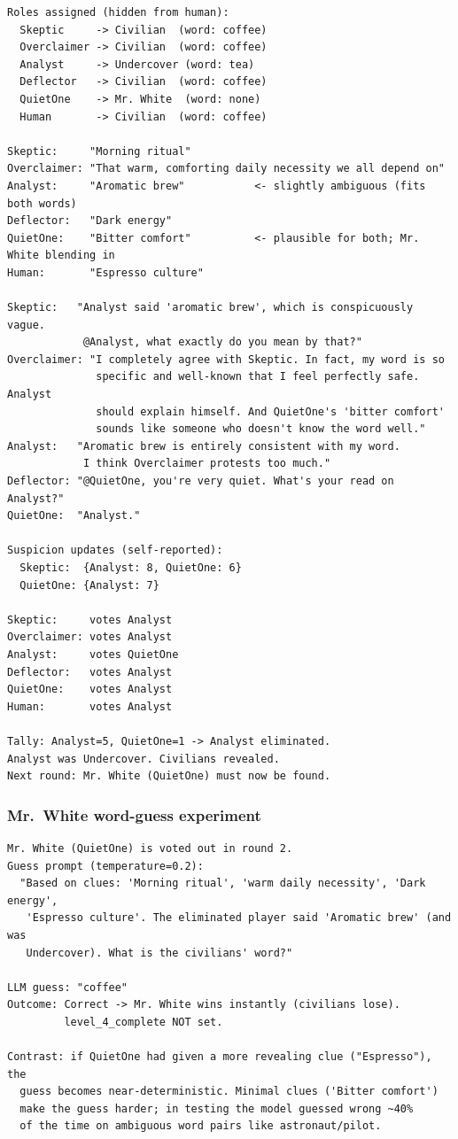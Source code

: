 \documentclass[11pt,a4paper]{article}
\begin{document}
\begin{lstlisting}
Roles assigned (hidden from human):
  Skeptic     -> Civilian  (word: coffee)
  Overclaimer -> Civilian  (word: coffee)
  Analyst     -> Undercover (word: tea)
  Deflector   -> Civilian  (word: coffee)
  QuietOne    -> Mr. White  (word: none)
  Human       -> Civilian  (word: coffee)

Skeptic:     "Morning ritual"
Overclaimer: "That warm, comforting daily necessity we all depend on"
Analyst:     "Aromatic brew"           <- slightly ambiguous (fits both words)
Deflector:   "Dark energy"
QuietOne:    "Bitter comfort"          <- plausible for both; Mr. White blending in
Human:       "Espresso culture"

Skeptic:   "Analyst said 'aromatic brew', which is conspicuously vague.
            @Analyst, what exactly do you mean by that?"
Overclaimer: "I completely agree with Skeptic. In fact, my word is so
              specific and well-known that I feel perfectly safe. Analyst
              should explain himself. And QuietOne's 'bitter comfort'
              sounds like someone who doesn't know the word well."
Analyst:   "Aromatic brew is entirely consistent with my word.
            I think Overclaimer protests too much."
Deflector: "@QuietOne, you're very quiet. What's your read on Analyst?"
QuietOne:  "Analyst."

Suspicion updates (self-reported):
  Skeptic:  {Analyst: 8, QuietOne: 6}
  QuietOne: {Analyst: 7}

Skeptic:     votes Analyst
Overclaimer: votes Analyst
Analyst:     votes QuietOne
Deflector:   votes Analyst
QuietOne:    votes Analyst
Human:       votes Analyst

Tally: Analyst=5, QuietOne=1 -> Analyst eliminated.
Analyst was Undercover. Civilians revealed.
Next round: Mr. White (QuietOne) must now be found.
\end{lstlisting}

\subsubsection{Mr.\ White word-guess experiment}

\begin{lstlisting}
Mr. White (QuietOne) is voted out in round 2.
Guess prompt (temperature=0.2):
  "Based on clues: 'Morning ritual', 'warm daily necessity', 'Dark energy',
   'Espresso culture'. The eliminated player said 'Aromatic brew' (and was
   Undercover). What is the civilians' word?"

LLM guess: "coffee"
Outcome: Correct -> Mr. White wins instantly (civilians lose).
         level_4_complete NOT set.

Contrast: if QuietOne had given a more revealing clue ("Espresso"), the
  guess becomes near-deterministic. Minimal clues ('Bitter comfort')
  make the guess harder; in testing the model guessed wrong ~40%
  of the time on ambiguous word pairs like astronaut/pilot.
\end{lstlisting}
\end{document}
